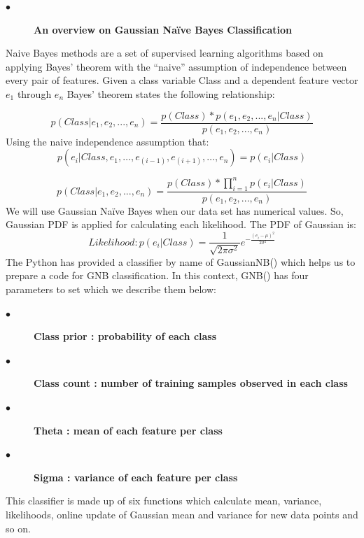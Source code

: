 \documentclass[journal,transmag]{IEEEtran}
\begin{document}
			\begin{description}
          \item[$\bullet$] \bf{An overview on Gaussian Naïve Bayes Classification}
            \end{description}
Naive Bayes methods are a set of supervised learning algorithms based on applying Bayes’ theorem with the “naive” assumption of independence between every pair of features. Given a class variable Class and a dependent feature vector $e_1$ through $e_n$ Bayes’ theorem states the following relationship:

\begin{equation} \label{eq1}
p(Class | e_1,e_2,...,e_n)  = \frac{p(Class)*p(e_1,e_2,...,e_n|Class)}{p(e_1,e_2,...,e_n)} 
\end{equation}
Using the naive independence assumption that:
\begin{equation} \label{eq2}
p(e_i | Class,e_1,…,e_{(i-1)},e_{(i+1)},…,e_n )  = p(e_i | Class)
\end{equation}

\begin{equation} \label{eq3}
p(Class | e_1,e_2,...,e_n)  = \frac{p(Class)*\prod_{i=1} ^n p(e_i|Class)}{p(e_1,e_2,...,e_n)} 
\end{equation}
We will use Gaussian Naïve Bayes when our data set has numerical values. So, Gaussian PDF is applied for calculating each likelihood. The PDF of Gaussian is:
\begin{equation} \label{eq4}
Likelihood: p(e_i | Class)  =\frac{1}{\sqrt{2\pi \sigma^2}} e^{-\frac{(e_i-\mu)^2 }{2\sigma^2}}
\end{equation}
The Python has provided a classifier by name of GaussianNB() which helps us to prepare a code for GNB classification. In this context, GNB() has four parameters to set which we describe them below:
	\begin{description}
          \item[$\bullet$] \bf{Class prior} : probability of each class
          \item[$\bullet$] \bf{Class count} : number of training samples observed in each class
          \item[$\bullet$] \bf{Theta } : mean of each feature per class
          \item[$\bullet$] \bf{Sigma} : variance of each feature per class
            \end{description}
This classifier is made up of six functions which calculate mean, variance, likelihoods, online update of Gaussian mean and variance for new data points and so on.
\end{document}
